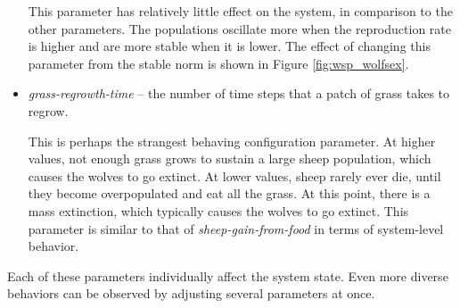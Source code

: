 \begin{itemize}
This parameter has relatively little effect on the system, in comparison to the other parameters.
The populations oscillate more when the reproduction rate is higher and are more stable when it is lower.
The effect of changing this parameter from the stable norm is  shown in Figure \ref{fig:wsp_wolfsex}.

   \item \textit{grass-regrowth-time} -- the number of time steps that a patch of grass takes to regrow.

This is perhaps the strangest behaving configuration parameter.
At higher values, not enough grass grows to sustain a large sheep population, which causes the wolves to go extinct.
At lower values, sheep rarely ever die, until they become overpopulated and eat all the grass.
At this point, there is a mass extinction, which typically causes the wolves to go extinct.
This parameter is similar to that of \textit{sheep-gain-from-food} in terms of system-level behavior.

\end{itemize}
Each of these parameters individually affect the system state.
Even more diverse behaviors can be observed by adjusting several parameters at once.

